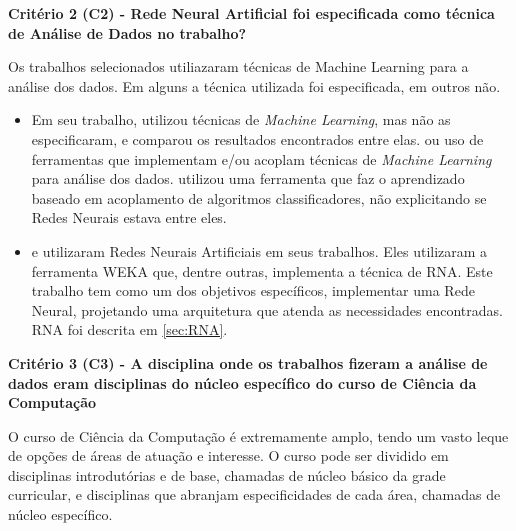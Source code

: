 \documentclass[
	12pt,				%
	openright,			%
	oneside,
	a4paper,			%
	english,			%
	french,				%
	spanish,			%
	brazil,				%
	]{abntex2}
\begin{document}
\textbf{Critério 2 (C2) - Rede Neural Artificial foi especificada como técnica de Análise de Dados no trabalho?}

Os trabalhos selecionados utiliazaram técnicas de Machine Learning para a análise dos dados. Em alguns a técnica utilizada foi especificada, em outros não.

\begin{itemize}
    \item Em seu trabalho,  utilizou técnicas de \textit{Machine Learning}, mas não as especificaram, e comparou os resultados encontrados entre elas. ou uso de ferramentas que implementam e/ou acoplam técnicas de \textit{Machine Learning} para análise dos dados.  utilizou uma ferramenta que faz o aprendizado baseado em acoplamento de algoritmos classificadores, não explicitando se Redes Neurais estava entre eles.
    \item {} e  utilizaram Redes Neurais Artificiais em seus trabalhos. Eles utilizaram a ferramenta WEKA que, dentre outras, implementa a técnica de RNA. Este trabalho tem como um dos objetivos específicos, implementar uma Rede Neural, projetando uma arquitetura que atenda as necessidades encontradas. RNA foi descrita em \autoref{sec:RNA}.
\end{itemize}

\textbf{Critério 3 (C3) - A disciplina onde os trabalhos fizeram a análise de dados eram disciplinas do núcleo específico do curso de Ciência da Computação}

O curso de Ciência da Computação é extremamente amplo, tendo um vasto leque de opções de áreas de atuação e interesse. O curso pode ser dividido em disciplinas introdutórias e de base, chamadas de núcleo básico da grade curricular, e disciplinas que abranjam especificidades de cada área, chamadas de núcleo específico.
\end{document}
